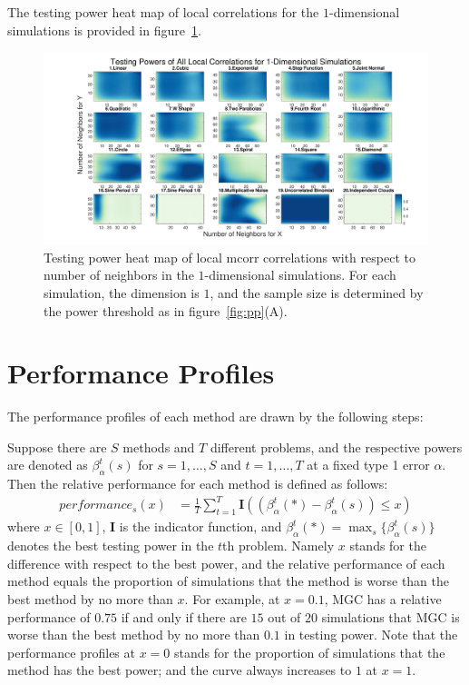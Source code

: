 \documentclass[11pt]{article}
\providecommand{\mb}[1]{\boldsymbol{#1}}
\begin{document}
The testing power heat map of local correlations for the $1$-dimensional simulations is provided in figure~\ref{figSim2}.
\begin{figure}[htbp]
\includegraphics[width=1.0\textwidth]{Figures/Fig2}
\caption{Testing power heat map of local mcorr correlations with respect to number of neighbors in the $1$-dimensional simulations. For each simulation, the dimension is $1$, and the sample size is determined by the power threshold as in figure~\ref{fig:pp}(A).
}
\label{figSim2}
\end{figure}

\section{Performance Profiles}
\label{appen:profiles}
The performance profiles of each method are drawn by the following steps:

Suppose there are $S$ methods and $T$ different problems, and the respective powers are denoted as $\beta_{\alpha}^{t}(s)$ for $s=1,\ldots,S$ and $t=1,\ldots,T$ at a fixed type 1 error $\alpha$. Then the relative performance for each method is defined as follows:
\begin{align*}
performance_{s}(x) &= \frac{1}{T} \sum_{t=1}^{T} \mb{I}((\beta_{\alpha}^{t}(*)-\beta_{\alpha}^{t}(s)) \leq x)
\end{align*}
where $x \in [0,1]$, $\mb{I}$ is the indicator function, and $\beta_{\alpha}^{t}(*) =\max_{s} \{\beta_{\alpha}^{t}(s)\}$ denotes the best testing power in the $t$th problem. Namely $x$ stands for the difference with respect to the best power, and the relative performance of each method equals the proportion of simulations that the method is worse than the best method by no more than $x$. For example, at $x=0.1$, MGC has a relative performance of $0.75$ if and only if there are $15$ out of $20$ simulations that MGC is worse than the best method by no more than $0.1$ in testing power. Note that the performance profiles at $x=0$ stands for the proportion of simulations that the method has the best power; and the curve always increases to $1$ at $x=1$. 
\end{document}

